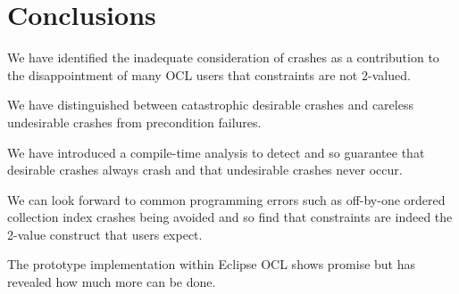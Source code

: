 \documentclass[
]{ceurart}
\begin{document}

\section{Conclusions}\label{Conclusions}

We have identified the inadequate consideration of crashes as a contribution to the disappointment of many OCL users that constraints are not 2-valued.

We have distinguished between catastrophic desirable crashes and careless undesirable crashes from precondition failures.

We have introduced a compile-time analysis to detect and so guarantee that desirable crashes always crash and that undesirable crashes never occur.

We can look forward to common programming errors such as off-by-one ordered collection index crashes being avoided and so find that constraints are indeed the 2-value construct that users expect.

The prototype implementation within Eclipse OCL shows promise but has revealed how much more can be done.
\end{document}
